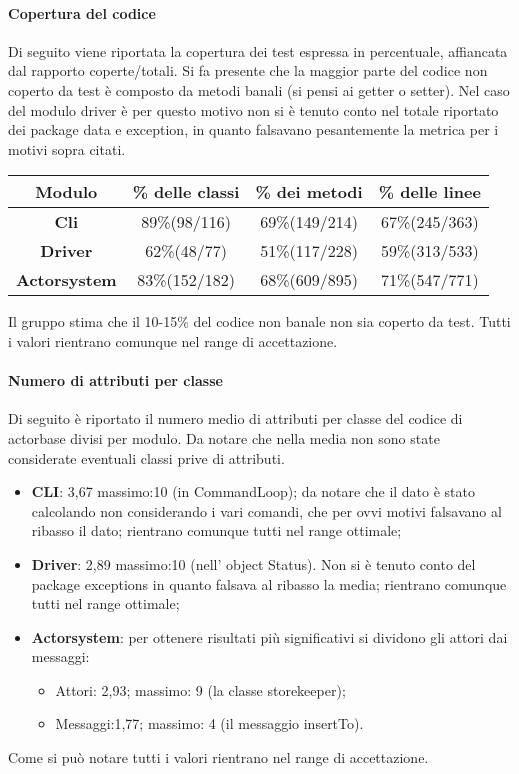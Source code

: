 \documentclass{scalatekids-article}
\begin{document}
\paragraph{Copertura del codice}
Di seguito viene riportata la copertura dei test espressa in percentuale, affiancata dal rapporto coperte/totali. Si fa presente che la maggior parte del codice non coperto da test è composto da metodi banali (si pensi ai getter o setter). Nel caso del  modulo driver è per questo motivo non si è tenuto conto nel totale riportato dei package data e exception, in quanto falsavano pesantemente la metrica per i motivi sopra citati.
\begin{center}
	\begin{tabular}{| c | c | c | c |}
		\hline
		Modulo & \% delle classi & \% dei metodi & \% delle linee \\
		\hline
		\textbf{Cli} & 89\%(98/116) & 69\%(149/214) & 67\%(245/363) \\
		\textbf{Driver} &  62\%(48/77) & 51\%(117/228) & 59\%(313/533)\\
		\textbf{Actorsystem} & 83\%(152/182) & 68\%(609/895) & 71\%(547/771)\\
		\hline
	\end{tabular}
	\end{center}
	Il gruppo stima che il 10-15\% del codice non banale non sia coperto da test. Tutti i valori rientrano comunque nel range di accettazione.
	\paragraph{Numero di attributi per classe}
	Di seguito è riportato il numero medio di attributi per classe del codice di actorbase divisi per modulo. Da notare che nella media non sono state considerate eventuali classi prive di attributi.
	\begin{itemize}
		\item \textbf{CLI}: 3,67 massimo:10 (in CommandLoop); da notare che il dato è stato calcolando non considerando i vari comandi, che per ovvi motivi falsavano al ribasso il dato; rientrano comunque tutti nel range ottimale;
		\item \textbf{Driver}: 2,89 massimo:10 (nell' object Status). Non si è tenuto conto del package exceptions in quanto falsava al ribasso la media; rientrano comunque tutti nel range ottimale;
		\item \textbf{Actorsystem}: per ottenere risultati più significativi si dividono gli attori dai messaggi:
		\begin{itemize}
			\item Attori: 2,93; massimo: 9 (la classe storekeeper);
			\item Messaggi:1,77; massimo: 4 (il messaggio insertTo).
		\end{itemize}
	\end{itemize}
	Come si può notare tutti i valori rientrano nel range di accettazione.
	
\end{document}
